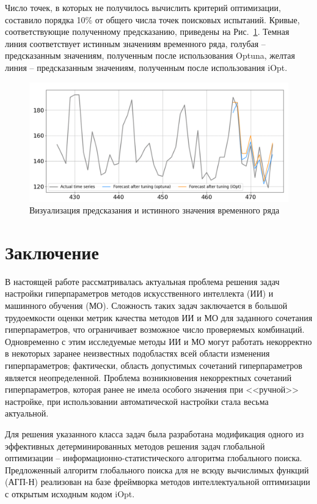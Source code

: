 \documentclass[a4paper,12pt,russian]{article}
\begin{document}
Число точек, в которых не получилось вычислить критерий оптимизации, составило порядка 10\% от общего числа точек поисковых испытаний. Кривые, соответствующие полученному предсказанию, приведены на Рис.~\ref{fig3}. Темная линия соответствует истинным значениям временного ряда, голубая -- предсказанным значениям, полученным после использования Optuna, желтая линия -- предсказанным значениям, полученным после использования iOpt.

\begin{figure}[h!]
\center \includegraphics[scale=1.1]{fig3.png}
\caption{Визуализация предсказания и истинного значения временного ряда} \label{fig3}
\end{figure}


\section{Заключение}

В настоящей работе рассматривалась актуальная проблема решения задач настройки гиперпараметров методов искусственного интеллекта (ИИ) и машинного обучения (МО).
Сложность таких задач заключается в большой трудоемкости оценки метрик качества методов ИИ и МО для заданного сочетания гиперпараметров, что ограничивает возможное число проверяемых комбинаций.
Одновременно с этим исследуемые методы ИИ и МО могут работать некорректно в некоторых заранее неизвестных подобластях всей области изменения гиперпараметров; фактически, область допустимых сочетаний гиперпараметров является неопределенной. Проблема возникновения некорректных сочетаний гиперпараметров, которая ранее не имела особого значения при <<ручной>> настройке, при использовании автоматической настройки стала весьма актуальной.

Для решения указанного класса задач была разработана модификация одного из эффективных детерминированных методов решения задач глобальной оптимизации -- ин\-фор\-ма\-ци\-он\-но-ста\-тис\-ти\-чес\-ко\-го алгоритма глобального поиска. Предложенный алгоритм глобального поиска для не всюду вычислимых функций (АГП-Н) реализован на базе фреймворка методов интеллектуальной оптимизации с открытым исходным кодом iOpt.
\end{document}
